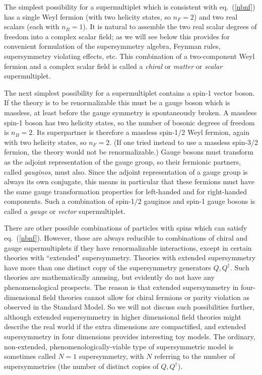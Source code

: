 The simplest possibility for a supermultiplet
which is consistent with eq.~(\ref{nbnf}) has a single
Weyl fermion (with two helicity states, so $n_F=2$) and two
real scalars (each with $n_B=1$). It is natural to assemble the two real
scalar degrees of freedom into a complex scalar field; as we will
see below this provides for convenient formulation of the supersymmetry
algebra, Feynman rules, supersymmetry violating effects, etc.
This combination of a two-component Weyl fermion and a complex
scalar field is called a {\it chiral} or {\it matter} or {\it scalar}
supermultiplet.

The next simplest possibility for a supermultiplet
contains a spin-1 vector boson.
If the theory is to be renormalizable this
must be a gauge boson which is massless, at least before the
gauge symmetry is spontaneously broken. A massless spin-1
boson has two helicity states, so 
the number of bosonic degrees of freedom is $n_B=2$.
Its superpartner is therefore a massless
spin-1/2 Weyl fermion, again with two
helicity states, so $n_F=2$.
(If one tried instead to use a massless spin-3/2 fermion, the theory would
not be renormalizable.)
Gauge bosons must transform as the adjoint
representation of the gauge group, so their fermionic partners, called
{\it gauginos},
must also.
Since the adjoint representation of a gauge group is always its
own conjugate, this means in particular that these fermions must have
the same gauge transformation properties for left-handed and
for right-handed components.
Such a combination of spin-1/2 gauginos and spin-1 gauge bosons
is called a {\it gauge} or {\it vector} supermultiplet.

There are other possible combinations of particles with spins
which can satisfy eq.~(\ref{nbnf}). However, these are always
reducible to combinations of chiral and gauge supermultiplets if they have
renormalizable interactions, except in
certain theories
with ``extended" supersymmetry. Theories with extended supersymmetry 
have more than one distinct copy of the supersymmetry generators
$Q,Q^\dagger$.
Such theories are mathematically amusing, but evidently do not have
any phenomenological prospects. The reason is that extended
supersymmetry in four-dimensional field theories cannot allow for chiral
fermions or
parity violation as observed in the Standard Model. So we will not discuss
such possibilities further, although extended supersymmetry in higher
dimensional field theories might describe the real world if the
extra dimensions are compactified, and extended supersymmetry in four
dimensions provides interesting toy models. The ordinary, non-extended,
phenomenologically-viable
type of supersymmetric model is sometimes called $N=1$ supersymmetry, with
$N$ referring to the number of supersymmetries (the number of distinct
copies of $Q, Q^\dagger$).


